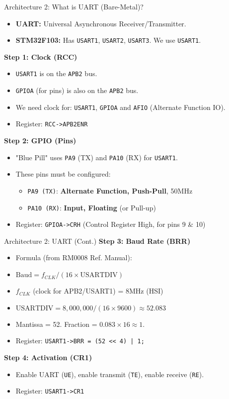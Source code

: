 \documentclass{beamer}
\begin{document}
\begin{frame}{Architecture 2: What is UART (Bare-Metal)?}
	\begin{itemize}
		\item \textbf{UART:} Universal Asynchronous Receiver/Transmitter.
		\item \textbf{STM32F103:} Has \texttt{USART1}, \texttt{USART2}, \texttt{USART3}. We use \texttt{USART1}.
	\end{itemize}
	
	\textbf{Step 1: Clock (RCC)}
	\begin{itemize}
		\item \texttt{USART1} is on the \texttt{APB2} bus.
		\item \texttt{GPIOA} (for pins) is also on the \texttt{APB2} bus.
		\item We need clock for: \texttt{USART1}, \texttt{GPIOA} and \texttt{AFIO} (Alternate Function IO).
		\item Register: \texttt{RCC->APB2ENR}
	\end{itemize}
	\textbf{Step 2: GPIO (Pins)}
	\begin{itemize}
		\item "Blue Pill" uses \texttt{PA9} (TX) and \texttt{PA10} (RX) for \texttt{USART1}.
		\item These pins must be configured:
		\begin{itemize}
			\item \texttt{PA9 (TX)}: \textbf{Alternate Function, Push-Pull}, 50MHz
			\item \texttt{PA10 (RX)}: \textbf{Input, Floating} (or Pull-up)
		\end{itemize}
		\item Register: \texttt{GPIOA->CRH} (Control Register High, for pins 9 \& 10)
	\end{itemize}
\end{frame}

\begin{frame}{Architecture 2: UART (Cont.)}
	\textbf{Step 3: Baud Rate (BRR)}
	\begin{itemize}
		\item Formula (from RM0008 Ref. Manual):
		\item $\text{Baud} = f_{CLK} / (16 \times \text{USARTDIV})$
		\item $f_{CLK}$ (clock for APB2/USART1) = 8MHz (HSI)
		\item $\text{USARTDIV} = 8,000,000 / (16 \times 9600) \approx 52.083$
		\item Mantissa = 52. Fraction = $0.083 \times 16 \approx 1$.
		\item Register: \texttt{USART1->BRR = (52 << 4) | 1;}
	\end{itemize}
	
	\medskip
	\textbf{Step 4: Activation (CR1)}
	\begin{itemize}
		\item Enable UART (\texttt{UE}), enable transmit (\texttt{TE}), enable receive (\texttt{RE}).
		\item Register: \texttt{USART1->CR1}
	\end{itemize}
\end{frame}
\end{document}
